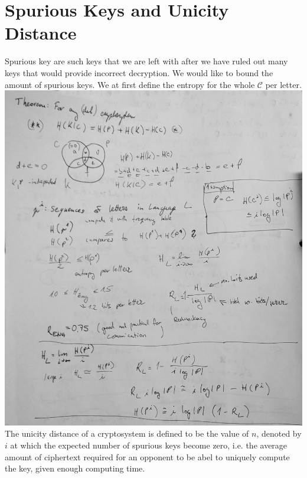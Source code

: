 \documentclass[a4paper,10pt]{article}
\newcommand{\mc}[1]{\ensuremath{\mathcal{#1}}}
\begin{document}
\section*{Spurious Keys and Unicity Distance}
Spurious key are such keys that we are left with after we have ruled out many keys that would provide incorrect decryption. We would like to bound the amount of spurious keys. We at first define the entropy for the whole \mc{C} per letter.\\
\includegraphics[width=\textwidth]{entropy.jpg}
The unicity distance of a cryptosystem is defined to be the value of $n$, denoted by $i$ at which the expected number of spurious keys become zero, i.e. the average amount of ciphertext required for an opponent to be abel to uniquely compute the key, given enough computing time.
\end{document}
